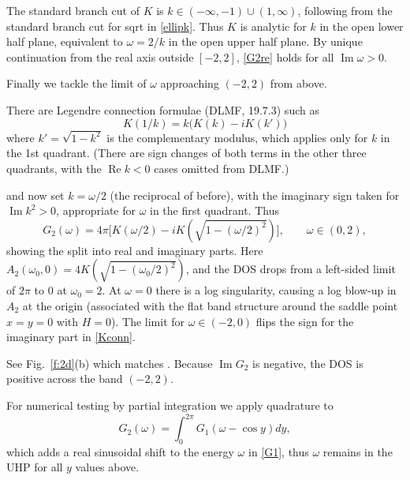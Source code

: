 \documentclass[11pt]{article}
\newcommand{\be}{\begin{equation}}
\newcommand{\ee}{\end{equation}}
\DeclareMathOperator{\re}{Re}
\DeclareMathOperator{\im}{Im}
\newcommand{\om}{\omega}
\begin{document}
The standard branch cut of $K$ is $k\in(-\infty,-1)\cup (1,\infty)$,
following from the standard
branch cut for sqrt in \eqref{ellipk}.
Thus $K$ is analytic for $k$ in the open lower half plane,
equivalent to $\om = 2/k$ in the open upper half plane.
By unique continuation from the real axis outside $[-2,2]$,
\eqref{G2re} holds for all $\im \om >0$.

Finally we tackle the limit of $\om$ approaching $(-2,2)$ from above.

There are Legendre connection formulae (DLMF, 19.7.3) such as
\be
K(1/k) = k\big( K(k) - iK(k') \big)
\label{Kconn}
\ee
where $k'=\sqrt{1-k^2}$ is the complementary modulus, which
applies only for $k$ in the 1st quadrant. (There are
sign changes of both terms in the other three quadrants,
with the $\re k < 0$ cases omitted from DLMF.)


and now set $k=\om/2$
(the reciprocal of before),
with the imaginary sign taken for $\im k^2 > 0$, appropriate
for $\om$ in the first quadrant.
Thus
\[
G_2(\om) = 4\pi \bigl[ K(\om/2) -i K(\sqrt{1-(\om/2)^2}) \bigr],
\qquad \om \in (0,2),
\]
showing the split into real and imaginary parts.
Here $A_2(\om_0,0) = 4K(\sqrt{1-(\om_0/2)^2})$,
and the DOS drops from a left-sided limit of $2\pi$ to $0$ at $\om_0=2$.
At $\om=0$ there is a log singularity, causing a log blow-up
in $A_2$ at the origin (associated with the flat band structure
around the saddle point $x=y=0$ with $H=0$).
The limit for $\om \in (-2,0)$ flips the sign for the imaginary part in 
\eqref{Kconn}.

See Fig.~\ref{f:2d}(b) which matches \cite[Fig.~5.7]{economou}.
Because $\im G_2$ is negative, the DOS is positive across the band $(-2,2)$.


For numerical testing by partial integration we apply quadrature to
\be
G_2(\om) = \int_{0}^{2\pi} G_1(\om - \cos y) dy,
\ee
which adds a real sinusoidal shift to the energy $\om$ in \eqref{G1},
thus $\om$ remains in the UHP for all $y$ values above.




\end{document}
